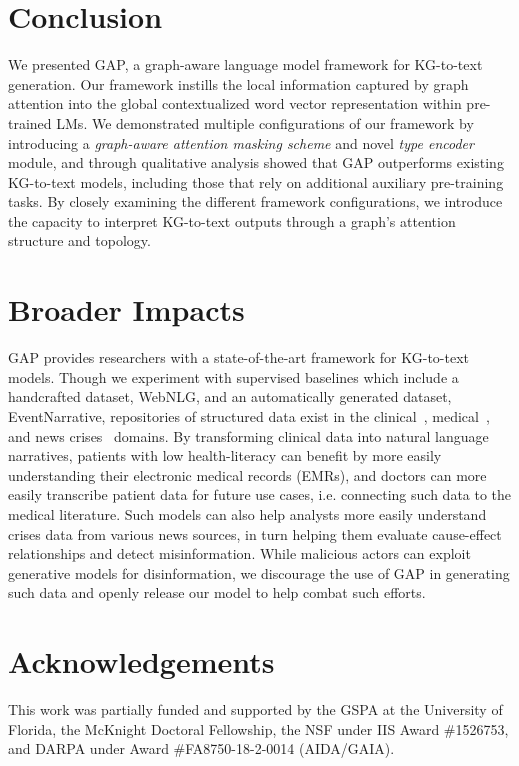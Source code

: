 \documentclass[11pt]{article}
\begin{document}
\section{Conclusion}
We presented GAP, a graph-aware language model framework for KG-to-text generation. Our framework instills the local information captured by graph attention into the global contextualized word vector representation within pre-trained LMs. We demonstrated multiple configurations of our framework by introducing a \textit{graph-aware attention masking scheme} and novel \textit{type encoder} module, and through qualitative analysis showed that GAP outperforms existing KG-to-text models, including those that rely on additional auxiliary pre-training tasks. By closely examining the different framework configurations, we introduce the capacity to interpret KG-to-text outputs through a graph's attention structure and topology.

\section{Broader Impacts}
GAP provides researchers with a state-of-the-art framework for KG-to-text models. Though we experiment with supervised baselines which include a handcrafted dataset, WebNLG, and an automatically generated dataset, EventNarrative, repositories of structured data exist in the clinical~\cite{johnson2016mimic}, medical~\cite{bodenreider2004unified}, and news crises~\cite{leetaru2013gdelt,ward2013comparing} domains. By transforming clinical data into natural language narratives, patients with low health-literacy can benefit by more easily understanding their electronic medical records (EMRs), and doctors can more easily transcribe patient data for future use cases, i.e. connecting such data to the medical literature. Such models can also help analysts more easily understand crises data from various news sources, in turn helping them evaluate cause-effect relationships and detect misinformation. While malicious actors can exploit generative models for disinformation, we discourage the use of GAP in generating such data and openly release our model to help combat such efforts. 

\section*{Acknowledgements}
This work was partially funded and supported by the GSPA at the University of Florida, the McKnight Doctoral Fellowship, the NSF under IIS Award \#1526753, and DARPA under Award \#FA8750-18-2-0014 (AIDA/GAIA).
\end{document}
